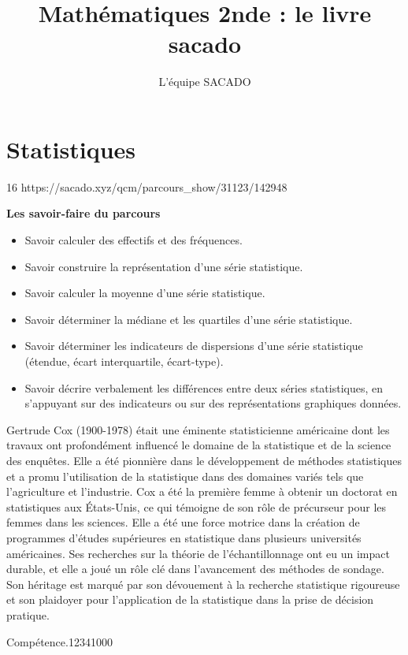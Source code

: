 



\title{Mathématiques 2nde  : le livre sacado}
\author{L'équipe SACADO}




\chapter{Statistiques}{16}
{https://sacado.xyz/qcm/parcours_show/31123/142948}
{
 \begin{CpsCol}
	\textbf{Les savoir-faire du parcours}
 	\begin{itemize}
 		\item Savoir calculer des effectifs et des fréquences.
 		\item Savoir construire la représentation d'une série statistique.
 		\item Savoir calculer la moyenne d'une série statistique.
 		\item Savoir déterminer la médiane et les quartiles d'une série statistique.
 		\item Savoir déterminer les indicateurs de dispersions d'une série statistique (étendue, écart interquartile, écart-type).
 		\item Savoir décrire verbalement les différences entre deux séries statistiques, en s'appuyant sur des indicateurs ou sur des représentations graphiques données.
 	\end{itemize}
 \end{CpsCol}

\begin{His}
Gertrude Cox (1900-1978) était une éminente statisticienne américaine dont les travaux ont profondément influencé le domaine de la statistique et de la science des enquêtes. Elle a été pionnière dans le développement de méthodes statistiques et a promu l'utilisation de la statistique dans des domaines variés tels que l'agriculture et l'industrie. Cox a été la première femme à obtenir un doctorat en statistiques aux États-Unis, ce qui témoigne de son rôle de précurseur pour les femmes dans les sciences. Elle a été une force motrice dans la création de programmes d'études supérieures en statistique dans plusieurs universités américaines. Ses recherches sur la théorie de l'échantillonnage ont eu un impact durable, et elle a joué un rôle clé dans l'avancement des méthodes de sondage. Son héritage est marqué par son dévouement à la recherche statistique rigoureuse et son plaidoyer pour l'application de la statistique dans la prise de décision pratique.
\end{His}

\begin{ExoDec}{Compétence.}{1234}{1}{0}{0}{0}
\end{ExoDec}
}

